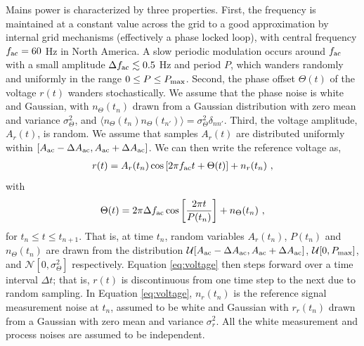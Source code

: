 \documentclass[pra,superscriptaddress,reprint,amsmath,amssymb,nofootinbib]{revtex4-2}
\begin{document}
 
 Mains power is characterized by three properties. First, the frequency is maintained at a constant value across the grid to a good approximation by internal grid mechanisms (effectively a phase locked loop), with central frequency $f_{\rm ac} = 60$ Hz in North America. A slow periodic modulation occurs around $f_{\rm ac}$ with a small amplitude $\Delta f_{\rm ac} \lesssim 0.5$ Hz and period $P$, which wanders randomly and uniformly in the range $0 \leq P \leq P_{\rm max}$. Second, the phase offset $\Theta(t)$ of the voltage $r(t)$ wanders stochastically. We assume that the phase noise is white and Gaussian, with $n_{\Theta}(t_n)$ drawn from a Gaussian distribution with zero mean and variance $\sigma_{\Theta}^2$, and $\langle n_{\Theta} (t_n) n_{\Theta} (t_{n'})\rangle = \sigma^2_{\Theta} \delta_{n n'}$. Third, the voltage amplitude, $A_r(t)$, is random. We assume that samples $A_r(t)$ are distributed uniformly within $[A_{\rm ac} - \Delta A_{\rm ac} , A_{\rm ac} + \Delta A_{\rm ac}]$. We can then write the reference voltage as,
 \begin{eqnarray}
 	r(t) = A_r(t_n) \cos \left[ 2 \pi f_{\rm ac} t + \Theta(t)\right] +n_r(t_n) \ ,
 	\label{eq:voltage}
 \end{eqnarray}
with
 \begin{eqnarray}
\Theta(t) = 2 \pi \Delta f_{\rm ac} \cos\left[\frac{2 \pi t}{P(t_n)}\right] + n_{\Theta} (t_n) \ ,
\label{eq:voltage_theta}
\end{eqnarray}
for $t_n \leq t \leq t_{n+1}$. That is, at time $t_n$, random variables $A_r(t_n)$, $P(t_n)$ and $n_{\Theta} (t_n)$ are drawn from the distribution $\mathcal{U}[A_{\rm ac} - \Delta A_{\rm ac},A_{\rm ac} + \Delta A_{\rm ac} ]$, $\mathcal{U}[0, P_{\rm max}]$, and $\mathcal{N} [0, \sigma_{\Theta}^2]$ respectively. Equation \eqref{eq:voltage} then steps forward over a time interval $\Delta t$; that is, $r(t)$ is discontinuous from one time step to the next due to random sampling. In Equation \eqref{eq:voltage}, $n_r(t_n)$ is the reference signal measurement noise at $t_n$, assumed to be white and Gaussian with $r_r(t_n)$ drawn from a Gaussian with zero mean and variance $\sigma_r^2$. All the white measurement and process noises are assumed to be independent. \newline 
\end{document}
